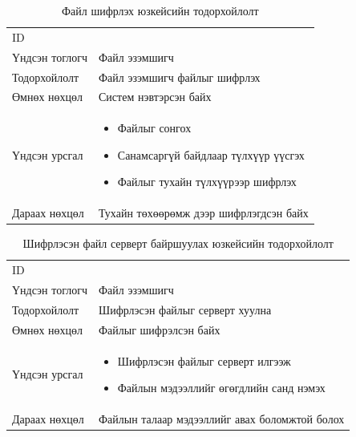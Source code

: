 \begin{table}[H]
    \footnotesize
    \centering
    \begin{tabularx}{\textwidth}{|>{\hsize=0.3\hsize}X|>{\hsize=0.7\hsize}X|}
        \hline
        \multicolumn{2}{|c|}{Файл шифрлэх} \\
        \hline
        ID & 3 \\
        \hline
        Үндсэн тоглогч & Файл эзэмшигч\\
        \hline
        Тодорхойлолт & Файл эзэмшигч файлыг шифрлэх\\
        \hline
        Өмнөх нөхцөл & Систем нэвтэрсэн байх\\
        \hline
        Үндсэн урсгал &
        \begin{minipage}{\linewidth}
            \begin{itemize}
                \item Файлыг сонгох
                \item Санамсаргүй байдлаар түлхүүр үүсгэх
                \item Файлыг тухайн түлхүүрээр шифрлэх
            \end{itemize}
        \end{minipage}
        \\
        \hline
        Дараах нөхцөл & Тухайн төхөөрөмж дээр шифрлэгдсэн байх\\
        \hline
    \end{tabularx}
    \caption{Файл шифрлэх юзкейсийн тодорхойлолт}
\end{table}

\begin{table}[H]
    \footnotesize
    \centering
    \begin{tabularx}{\textwidth}{|>{\hsize=0.3\hsize}X|>{\hsize=0.7\hsize}X|}
        \hline
        \multicolumn{2}{|c|}{Шифрлэсэн файл серверт байршуулах} \\
        \hline
        ID & 4 \\
        \hline
        Үндсэн тоглогч & Файл эзэмшигч \\
        \hline
        Тодорхойлолт & Шифрлэсэн файлыг серверт хуулна \\
        \hline
        Өмнөх нөхцөл & Файлыг шифрэлсэн байх \\
        \hline
        Үндсэн урсгал &
        \begin{minipage}{\linewidth}
            \begin{itemize}
                \item Шифрлэсэн файлыг серверт илгээж
                \item Файлын мэдээллийг өгөгдлийн санд нэмэх 
            \end{itemize}
        \end{minipage}
        \\
        \hline
        Дараах нөхцөл & Файлын талаар мэдээллийг авах боломжтой болох \\
        \hline
    \end{tabularx}
    \caption{Шифрлэсэн файл серверт байршуулах юзкейсийн тодорхойлолт}
\end{table}


